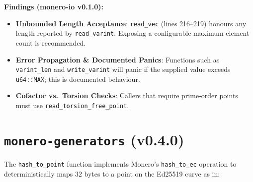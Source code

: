 \documentclass[12pt,a4paper]{article}
\begin{document}
\noindent\textbf{Findings (monero-io v0.1.0):}
\begin{itemize}
  \item \textbf{Unbounded Length Acceptance}:
        \texttt{read\_vec} (lines 216–219) honours any length reported
        by \texttt{read\_varint}.  Exposing a configurable maximum
        element count is recommended.

  \item \textbf{Error Propagation \& Documented Panics}:
        Functions such as \texttt{varint\_len} and
        \texttt{write\_varint} will panic if the supplied value
        exceeds \texttt{u64::MAX}; this is documented behaviour.

  \item \textbf{Cofactor vs.\ Torsion Checks}:
        Callers that require prime-order points must use
        \texttt{read\_torsion\_free\_point}.
\end{itemize}




\section{\texttt{monero-generators} (v0.4.0)}

The \texttt{hash\_to\_point} function implements Monero's \texttt{hash\_to\_ec} operation to deterministically maps $32$ bytes to a point on the Ed25519 curve as in:
\end{document}
